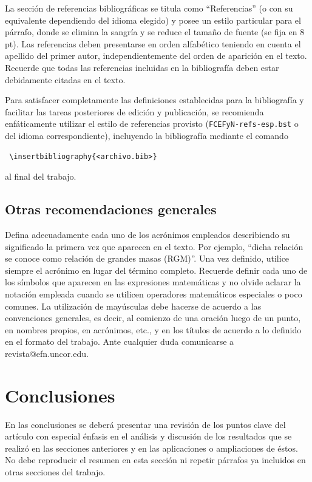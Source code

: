 \documentclass[esp]{FCEFyN-class}
\begin{document}
La sección de referencias bibliográficas se titula como ``Referencias'' (o con su equivalente
dependiendo del idioma elegido) y posee un estilo particular para el párrafo, donde se elimina la
sangría y se reduce el tamaño de fuente (se fija en 8 pt).
Las referencias deben presentarse en orden alfabético teniendo en cuenta el apellido del primer autor,
independientemente del orden de aparición en el texto. Recuerde que todas las referencias incluidas en
la bibliografía deben estar debidamente citadas en el texto.

Para satisfacer completamente las definiciones establecidas para la bibliografía y facilitar las
tareas posteriores de edición y publicación, se recomienda enfáticamente utilizar el estilo de
referencias provisto (\texttt{FCEFyN-refs-esp.bst} o del idioma correspondiente), incluyendo la
bibliografía mediante el comando
\begin{verbatim}
 \insertbibliography{<archivo.bib>} 
\end{verbatim}
al final del trabajo.

\subsection{Otras recomendaciones generales}
Defina adecuadamente cada uno de los acrónimos empleados describiendo su significado la primera vez
que aparecen en el texto. Por ejemplo, ``dicha relación se conoce como relación de grandes masas
(RGM)''. Una vez definido, utilice siempre el acrónimo en lugar del término completo.
Recuerde definir cada uno de los símbolos que aparecen en las expresiones matemáticas y no olvide
aclarar la notación empleada cuando se utilicen operadores matemáticos especiales o poco comunes.
La utilización de mayúsculas debe hacerse de acuerdo a las convenciones generales, es decir,
al comienzo de una oración luego de un punto, en nombres propios, en acrónimos, etc., y en los títulos
de acuerdo a lo definido en el formato del trabajo.
Ante cualquier duda comunicarse a revista@efn.uncor.edu.


\section{Conclusiones}
En las conclusiones se deberá presentar una revisión de los puntos clave del artículo con especial
énfasis en el análisis y discusión de los resultados que se realizó en las secciones anteriores y en
las aplicaciones o ampliaciones de éstos. No debe reproducir el resumen en esta sección ni repetir
párrafos ya incluidos en otras secciones del trabajo.
\end{document}
